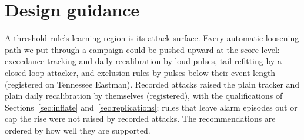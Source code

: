 \documentclass[sigconf]{acmart}
\begin{document}
\section{Design guidance}
\label{sec:design}

A threshold rule's learning region is its attack surface. Every automatic loosening path we put through
a campaign could be pushed upward at the score level: exceedance tracking and daily recalibration by
loud pulses, tail refitting by a closed-loop attacker, and exclusion rules by pulses below their event
length (registered on Tennessee Eastman). Recorded attacks raised the plain tracker and plain daily
recalibration by themselves (registered), with the qualifications of Sections~\ref{sec:inflate}
and~\ref{sec:replications}; rules that leave alarm episodes out or cap the rise were not raised by
recorded attacks. The recommendations are ordered by how well they are supported.
\end{document}
